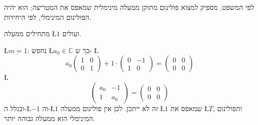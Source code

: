 \documentclass[english,hebrew]{article}
\begin{document}
לפי המשפט, מספיק למצוא פולינום מתוקן ממעלה מינימלית שמאפס את המטריצה;
הוא יהיה הפולינום המינימלי, לפי היחידות.

מתחילים ממעלה \L{$1$} ועולים.

\L{$\underline{m=1}$}: נחפש \L{$a_{0}\in\mathbb{C}$} כך ש- \L{%
\[
a_{0}\begin{pmatrix}1 & 0\\
0 & 1
\end{pmatrix}+1\cdot\begin{pmatrix}0 & -1\\
1 & 0
\end{pmatrix}=\begin{pmatrix}0 & 0\\
0 & 0
\end{pmatrix}
\]
}%
\L{%
\[
\begin{pmatrix}a_{0} & -1\\
1 & a_{0}
\end{pmatrix}=\begin{pmatrix}0 & 0\\
0 & 0
\end{pmatrix}
\]
}%
ובגלל ה-\L{$-1$} וה-\L{$1$} זה לא ייתכן. לכן אין פולינום ממעלה \L{$1$}
שמאפס את \L{$T$}, והפולינום המינימלי הוא ממעלה גבוהה יותר.
\end{document}

